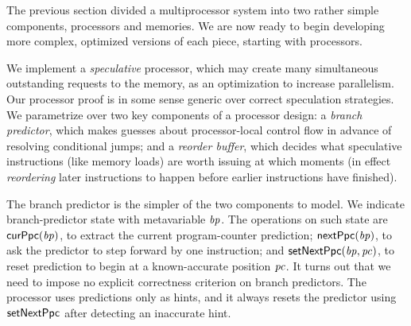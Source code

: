 The previous section divided a multiprocessor system into two rather
simple components, processors and memories.  We are now ready to begin
developing more complex, optimized versions of each piece, starting
with processors.

We implement a \emph{speculative} processor, which may create many
simultaneous outstanding requests to the memory, as an optimization to
increase parallelism.  Our processor proof is in some sense generic
over correct speculation strategies.  We parametrize over two key
components of a processor design: a \emph{branch predictor}, which
makes guesses about processor-local control flow in advance of
resolving conditional jumps; and a
\emph{reorder buffer}, which decides what speculative instructions (like memory loads)
are worth issuing at which moments (in effect \emph{reordering} later
instructions to happen before earlier instructions have finished).

The branch predictor is the simpler of the two components to model.
We indicate branch-predictor state with metavariable $\mathit{bp}$.
The operations on such state are $\mathsf{curPpc}(\mathit{bp})$, to extract the
current program-counter prediction; $\mathsf{nextPpc}(\mathit{bp})$, to ask the
predictor to step forward by one instruction; and $\mathsf{setNextPpc}(\mathit{bp}, \mathit{pc})$,
to reset prediction to begin at a known-accurate position $\mathit{pc}$.  It
turns out that we need to impose no explicit correctness criterion on
branch predictors.  The processor uses predictions only as hints, and
it always resets the predictor using $\mathsf{setNextPpc}$ after detecting an
inaccurate hint.

